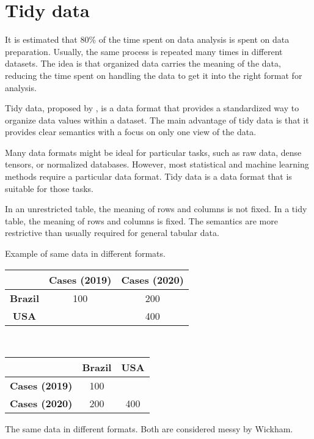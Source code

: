 \section{Tidy data}

It is estimated that 80\% of the time spent on data analysis is spent on data preparation.
Usually, the same process is repeated many times in different datasets. The idea is that
organized data carries the meaning of the data, reducing the time spent on handling
the data to get it into the right format for analysis.

Tidy data, proposed by \textcite{Wickham2014},
is a data format that provides a standardized way to organize data values within
a dataset.  The main advantage of tidy data is that it provides clear semantics with a focus
on only one view of the data.

Many data formats might be ideal for particular tasks, such as raw data, dense tensors, or
normalized databases.  However, most statistical and machine learning methods
require a particular data format.  Tidy data is a data format that is suitable for those
tasks.


In an unrestricted table, the meaning of rows and columns is not fixed.  In a tidy table,
the meaning of rows and columns is fixed.  The semantics are more restrictive than usually
required for general tabular data.

\begin{tablebox}[label=tab:simple-messy]{Example of same data in different formats.}
  \centering
  \begin{tabular}{ccc}
    \toprule
     & \textbf{Cases (2019)} & \textbf{Cases (2020)} \\
    \midrule
    \textbf{Brazil} & 100 & 200 \\
    \textbf{USA} & & 400 \\
    \bottomrule
  \end{tabular}
  \\[1em]
  \begin{tabular}{ccc}
    \toprule
    & \textbf{Brazil} & \textbf{USA} \\
    \midrule
    \textbf{Cases (2019)} & 100 & \\
    \textbf{Cases (2020)} & 200 & 400 \\
    \bottomrule
  \end{tabular}
  \tcblower
  The same data in different formats.  Both are considered messy by Wickham.
\end{tablebox}

